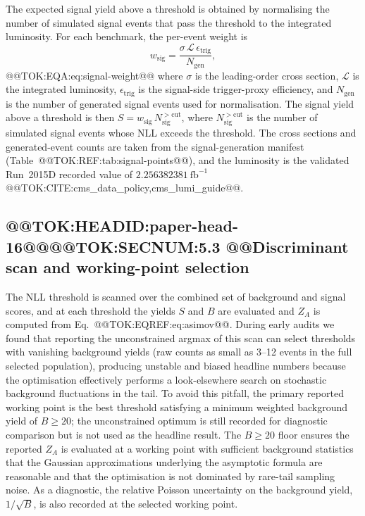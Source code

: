 \documentclass[11pt]{article}
\newcommand{\invfb}{\ensuremath{\mathrm{fb}^{-1}}}
\begin{document}
The expected signal yield above a threshold is obtained by normalising the
number of simulated signal events that pass the threshold to the integrated
luminosity. For each benchmark, the per-event weight is
\begin{equation}
  w_{\mathrm{sig}} = \frac{\sigma\, \mathcal{L}\, \epsilon_{\mathrm{trig}}}{N_{\mathrm{gen}}},
  
\end{equation}@@TOK:EQA:eq:signal-weight@@
where $\sigma$ is the leading-order cross section, $\mathcal{L}$ is the
integrated luminosity, $\epsilon_{\mathrm{trig}}$ is the signal-side trigger-proxy
efficiency, and $N_{\mathrm{gen}}$ is the number of generated signal events used
for normalisation. The signal yield above a threshold is then
$S = w_{\mathrm{sig}}\, N_{\mathrm{sig}}^{>\mathrm{cut}}$, where
$N_{\mathrm{sig}}^{>\mathrm{cut}}$ is the number of simulated signal events whose
NLL exceeds the threshold. The cross sections and generated-event counts are
taken from the signal-generation manifest (Table~@@TOK:REF:tab:signal-points@@),
and the luminosity is the validated Run~2015D recorded value of
$2.256382381~\invfb$ @@TOK:CITE:cms_data_policy,cms_lumi_guide@@.

\subsection{@@TOK:HEADID:paper-head-16@@@@TOK:SECNUM:5.3 @@Discriminant scan and working-point selection}

The NLL threshold is scanned over the combined set of background and signal
scores, and at each threshold the yields $S$ and $B$ are evaluated and
$Z_A$ is computed from Eq.~@@TOK:EQREF:eq:asimov@@. During early audits we found
that reporting the unconstrained argmax of this scan can select thresholds
with vanishing background yields (raw counts as small as 3--12 events in the
full selected population), producing unstable and biased headline numbers
because the optimisation effectively performs a look-elsewhere search on
stochastic background fluctuations in the tail. To avoid this pitfall, the
primary reported working point is the best threshold satisfying a minimum
weighted background yield of $B\geq20$; the unconstrained optimum is still
recorded for diagnostic comparison but is not used as the headline result.
The $B\geq20$ floor ensures the reported $Z_A$ is evaluated at a working
point with sufficient background statistics that the Gaussian
approximations underlying the asymptotic formula are reasonable and that
the optimisation is not dominated by rare-tail sampling noise. As a
diagnostic, the relative Poisson uncertainty on the background yield,
$1/\sqrt{B}$, is also recorded at the selected working point.
\end{document}
